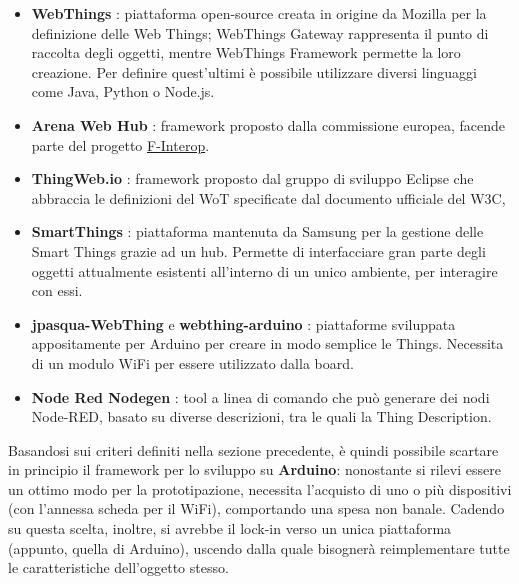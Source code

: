 \documentclass[12pt,a4paper,openright,oneside]{report}
\begin{document}
\begin{itemize}	
	\item \textbf{WebThings} \cite{webthings}: piattaforma open-source creata in origine da Mozilla per la definizione delle Web Things; WebThings Gateway rappresenta il punto di raccolta degli oggetti, mentre WebThings Framework permette la loro creazione. Per definire quest'ultimi è possibile utilizzare diversi linguaggi come Java, Python o Node.js.
	
	\item \textbf{Arena Web Hub} \cite{arenawh}: framework proposto dalla commissione europea, facende parte del progetto \href{https://www.f-interop.eu/}{F-Interop}.
	
	
	\item \textbf{ThingWeb.io} \cite{thingweb}: framework proposto dal gruppo di sviluppo Eclipse che abbraccia le definizioni del WoT specificate dal documento ufficiale del W3C,
	
	
	\item \textbf{SmartThings} \cite{smartthings}: piattaforma mantenuta da Samsung per la gestione delle Smart Things grazie ad un hub. Permette di interfacciare gran parte degli oggetti attualmente esistenti all'interno di un unico ambiente, per interagire con essi.
	
	\item \textbf{jpasqua-WebThing} \cite{jpasqua} e \textbf{webthing-arduino} \cite{wtarduino}: piattaforme sviluppata appositamente per Arduino per creare in modo semplice le Things. Necessita di un modulo WiFi per essere utilizzato dalla board.
	
	\item \textbf{Node Red Nodegen} \cite{nodered}: tool a linea di comando che può generare dei nodi Node-RED, basato su diverse descrizioni, tra le quali la Thing Description.
\end{itemize}


Basandosi sui criteri definiti nella sezione precedente, è quindi possibile scartare in principio il framework per lo sviluppo su \textbf{Arduino}: nonostante si rilevi essere un ottimo modo per la prototipazione, necessita l'acquisto di uno o più dispositivi (con l'annessa scheda per il WiFi), comportando una spesa non banale. Cadendo su questa scelta, inoltre, si avrebbe il lock-in verso un unica piattaforma (appunto, quella di Arduino), uscendo dalla quale bisognerà reimplementare tutte le caratteristiche dell'oggetto stesso.\\
\end{document}
